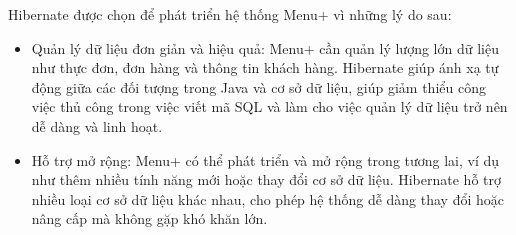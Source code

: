 \begin{enumerate}[(a)]
\begin{itemize}
		            Hibernate được chọn để phát triển hệ thống Menu+ vì những lý do sau:

		            \begin{itemize}
			            \item Quản lý dữ liệu đơn giản và hiệu quả: Menu+ cần quản lý lượng lớn dữ liệu như thực đơn, đơn hàng và thông tin khách hàng. Hibernate giúp ánh xạ tự động giữa các đối tượng trong Java và cơ sở dữ liệu, giúp giảm thiểu công việc thủ công trong việc viết mã SQL và làm cho việc quản lý dữ liệu trở nên dễ dàng và linh hoạt.
			            \item Hỗ trợ mở rộng: Menu+ có thể phát triển và mở rộng trong tương lai, ví dụ như thêm nhiều tính năng mới hoặc thay đổi cơ sở dữ liệu. Hibernate hỗ trợ nhiều loại cơ sở dữ liệu khác nhau, cho phép hệ thống dễ dàng thay đổi hoặc nâng cấp mà không gặp khó khăn lớn.
		            \end{itemize}
	      \end{itemize}


\end{enumerate}

